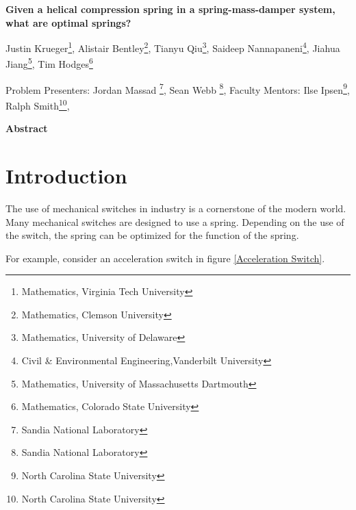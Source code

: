 \documentclass[10pt]{article}
\begin{document}
\centerline{\large \bf Given a helical compression spring in a spring-mass-damper system, what are optimal springs?}

\vspace{.1truein}

\def\thefootnote{\arabic{footnote}}
\begin{center}
  Justin Krueger\footnote{Mathematics, Virginia Tech University},
  Alistair Bentley\footnote{Mathematics, Clemson University},
  Tianyu Qiu\footnote{Mathematics, University of Delaware},
  Saideep Nannapaneni\footnote{Civil \& Environmental Engineering,Vanderbilt University},
  Jiahua Jiang\footnote{Mathematics, University of Massachusetts Dartmouth },
  Tim Hodges\footnote{Mathematics, Colorado State University}
\end{center}


\begin{center}
Problem Presenters: Jordan Massad \footnote{Sandia National Laboratory},
Sean Webb \footnote{Sandia National Laboratory},
	Faculty Mentors: Ilse Ipsen\footnote{North Carolina State University},
	Ralph Smith\footnote{North Carolina State University}, 
\end{center}


\vspace{.3truein}
\centerline{\bf Abstract}






\section{Introduction}
\label{sec:Introduction}

The use of mechanical switches in industry is a cornerstone of the modern world. Many mechanical switches are designed to use a spring. Depending on the use of the switch, the spring can be optimized for the function of the spring. 

For example, consider an acceleration switch in figure \ref{Acceleration Switch}. 
\end{document}
